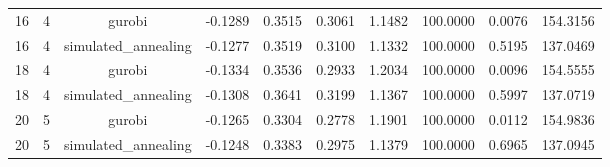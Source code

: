 \begin{table}[htbp]
\begin{tabular}{cccccccccc}
    16 & 4 & gurobi & -0.1289 & 0.3515 & 0.3061 & 1.1482 & 100.0000 & 0.0076 & 154.3156 \\
    16 & 4 & simulated\_annealing & -0.1277 & 0.3519 & 0.3100 & 1.1332 & 100.0000 & 0.5195 & 137.0469 \\
    18 & 4 & gurobi & -0.1334 & 0.3536 & 0.2933 & 1.2034 & 100.0000 & 0.0096 & 154.5555 \\
    18 & 4 & simulated\_annealing & -0.1308 & 0.3641 & 0.3199 & 1.1367 & 100.0000 & 0.5997 & 137.0719 \\
    20 & 5 & gurobi & -0.1265 & 0.3304 & 0.2778 & 1.1901 & 100.0000 & 0.0112 & 154.9836 \\
    20 & 5 & simulated\_annealing & -0.1248 & 0.3383 & 0.2975 & 1.1379 & 100.0000 & 0.6965 & 137.0945 \\
    \bottomrule
  \end{tabular}
\end{table}